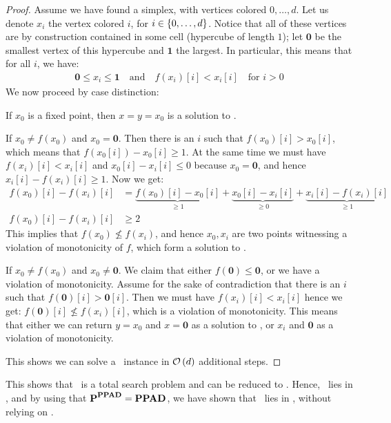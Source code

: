 \begin{proof}
    Assume we have found a simplex, with vertices colored $0, \dots, d$. Let us denote $x_i$ the vertex colored $i$, for $i \in \left\{0, \dots, d\right\}$. Notice that all of these vertices are by construction contained in some cell (hypercube of length $1$); let $\mathbf{0}$ be the smallest vertex of this hypercube and $\mathbf{1}$ the largest. In particular, this means that for all $i$, we have:
    \begin{align*}
        \mathbf{0} \leq x_i \leq \mathbf{1} \quad \text{and} \quad f(x_i)[i] < x_i[i] \quad \text{for $i > 0$}
    \end{align*}
    We now proceed by case distinction:
    \begin{case}{1}
        If $x_0$ is a fixed point, then $x = y = x_0$ is a solution to \Tarskistar.
    \end{case}
    \begin{case}{2}
        If $x_0 \neq f(x_0)$ and $x_0 = \mathbf{0}$. Then there is an $i$ such that $f(x_0)[i] > x_0[i]$, which means that $f(x_0[i]) - x_0[i] \geq 1$. At the same time we must have $f(x_i)[i] < x_i[i]$ and $x_0[i] - x_i[i] \leq 0$ because $x_0 = \mathbf{0}$, and hence $x_i[i] - f(x_i)[i] \geq 1$. Now we get:
        \begin{align*}
            f(x_0)[i] - f(x_i)[i] & = \underbrace{f(x_0)[i] - x_0[i]}_{\geq 1} + \underbrace{x_0[i] - x_i[i]}_{\geq 0} + \underbrace{x_i[i] - f(x_i)[i]}_{\geq 1} \\
            f(x_0)[i] - f(x_i)[i] & \geq 2
        \end{align*}
        This implies that $f(x_0) \not \leq f(x_i)$, and hence $x_0, x_i$ are two points witnessing a violation of monotonicity of $f$, which form a solution to \Tarskistar.
    \end{case}
    \begin{case}{3}
        If $x_0 \neq f(x_0)$ and $x_0 \neq \mathbf{0}$. We claim that either $f(\mathbf{0}) \leq \mathbf{0}$, or we have a violation of monotonicity. Assume for the sake of contradiction that there is an $i$ such that $f(\mathbf{0})[i] > \mathbf{0}[i]$. Then we must have $f(x_i)[i] < x_i[i]$ hence we get: $f(\mathbf{0})[i] \not\leq f(x_i)[i]$, which is a violation of monotonicity. This means that either we can return $y = x_0$ and $x = \mathbf{0}$ as a solution to \Tarskistar, or $x_i$ and $\mathbf{0}$ as a violation of monotonicity.
    \end{case}
    This shows we can solve a \Tarskistar\ instance in $\mathcal{O}\left(d\right)$ additional steps.
\end{proof}
This shows that \Tarskistar\ is a total search problem and can be reduced to \Sperner. Hence, \Tarskistar\ lies in \PPAD, and by using that $\textbf{P}^{\textbf{PPAD}} = \textbf{PPAD}$, we have shown that \Tarski\ lies in \PPAD, without relying on \Brouwer.